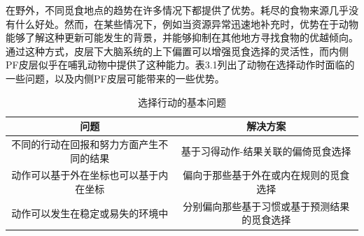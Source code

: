 在野外，不同觅食地点的趋势在许多情况下都提供了优势。耗尽的食物来源几乎没有什么好处。然而，在某些情况下，例如当资源异常迅速地补充时，优势在于动物能够了解这种更新可能发生的背景，并能够抑制在其他地方寻找食物的优越倾向。通过这种方式，皮层下大脑系统的上下偏置可以增强觅食选择的灵活性，而内侧PF皮层似乎在哺乳动物中提供了这种能力。表3.1列出了动物在选择动作时面临的一些问题，以及内侧PF皮层可能带来的一些优势。\par

\begin{table}[htbp]
	\newcommand{\tabincell}[2]{\begin{tabular}{@{}#1@{}}#2\end{tabular}} %
	\centering
	\caption{选择行动的基本问题}
	\renewcommand\arraystretch{1.5}	%
	\begin{tabular}{c c }	 %
		\hline	%
		问题 & 解决方案 \\	
		\hline  %
		不同的行动在回报和努力方面产生不同的结果 & 基于习得动作-结果关联的偏倚觅食选择 \\
		\hline
		动作可以基于外在坐标也可以基于内在坐标 & 偏向于那些基于外在或内在规则的觅食选择 \\
		\hline
		动作可以发生在稳定或易失的环境中 & 分别偏向那些基于习惯或基于预测结果的觅食选择 \\
		\hline
	\end{tabular}%
\end{table}%

